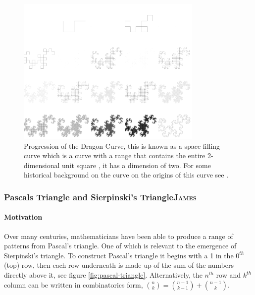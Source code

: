 \documentclass[a4paper,11pt,twoside]{article}
\begin{document}
\begin{figure}[htbp]
\centering
\includegraphics[width=9cm]{../Problems/Chaos/Spirals/dragon.png}
\caption{\label{dragon-turtle}Progression of the Dragon Curve, this is known as a space filling curve \cite[p. 350]{peitgenChaosFractalsNew2004} which is a curve with a range that contains the entire 2-dimensional unit square \cite{ventrellaSpaceFillingCurvesAre2014}, it has a dimension of two. For some historical background on the curve on the origins of this curve see \cite{tabachnikovDragonCurvesRevisited2014}.}
\end{figure}





 \newpage 
\subsubsection{Pascals Triangle and Sierpinski's Triangle\hfill{}\textsc{James}}
\label{pascal-sierpinski}
\paragraph{Motivation}
\label{sec:org526a387}
Over many centuries, mathematicians have been able to produce a range of patterns from Pascal's triangle. One of which is relevant to the emergence of Sierpinski's triangle. To construct Pascal's triangle it begins with a 1 in the \(0^{th}\) (top) row, then each row underneath is made up of the sum of the numbers directly above it, see figure \ref{fig:pascal-triangle}. Alternatively, the \(n^{th}\) row and \(k^{th}\) column can be written in combinatorics form, \(\binom{n}{k} = \binom{n-1}{k-1} + \binom{n-1}{k}\).
\end{document}
